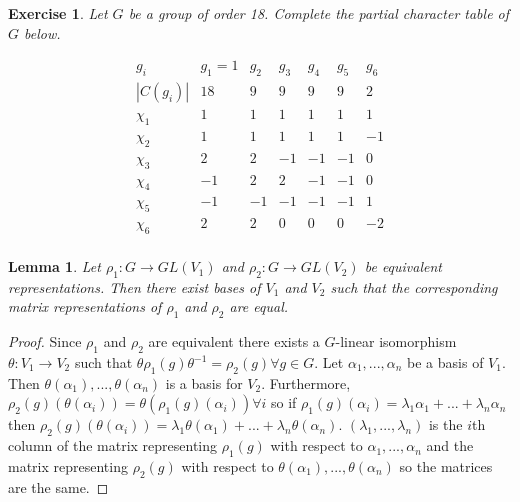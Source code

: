 \documentclass{article}
\newtheorem{lemma}[theorem]{Lemma}
\newtheorem{exercise}[theorem]{Exercise}
\begin{document}
\begin{exercise}
    Let \( G \) be a group of order 18. Complete the partial character table of \( G \) below.

    \[
    \begin{array}{c|cccccc}
    g_i & g_1 = 1 & g_2 & g_3 & g_4 & g_5 & g_6 \\
    |C(g_i)| & 18 & 9 & 9 & 9 & 9 & 2 \\
    \hline
    \chi_1 & 1 & 1 & 1 & 1 & 1 & 1 \\
    \chi_2 & 1 & 1 & 1 & 1 & 1 & -1 \\
    \chi_3 & 2 & 2 & -1 & -1 & -1 & 0 \\
    \chi_4 & -1 & 2 & 2 & -1 & -1 & 0 \\
    \chi_5 & -1 & -1 & -1 & -1 & -1 & 1 \\
    \chi_6 & 2 & 2 & 0 & 0 & 0 & -2 \\
    \end{array}
    \]
\end{exercise}


\begin{lemma}
Let $\rho_1:G\to GL(V_1)$ and $\rho_2:G\to GL(V_2)$ be equivalent representations. Then there exist bases of $V_1$ and $V_2$ such that the corresponding matrix representations of $\rho_1$ and $\rho_2$ are equal.
\end{lemma}
\begin{proof}
Since $\rho_1$ and $\rho_2$ are equivalent there exists a $G$-linear isomorphism $\theta:V_1\to V_2$ such that $\theta\rho_1(g)\theta^{-1}=\rho_2(g)\forall g\in G$. Let $\alpha_1,...,\alpha_n$ be a basis of $V_1$. Then $\theta(\alpha_1),...,\theta(\alpha_n)$ is a basis for $V_2$. Furthermore, $\rho_2(g)(\theta(\alpha_i))=\theta(\rho_1(g)(\alpha_i))\forall i$ so if $\rho_1(g)(\alpha_i)=\lambda_1\alpha_1+...+\lambda_n\alpha_n$ then $\rho_2(g)(\theta(\alpha_i))=\lambda_1\theta(\alpha_1)+...+\lambda_n\theta(\alpha_n)$. $(\lambda_1,...,\lambda_n)$ is the $i$th column of the matrix representing $\rho_1(g)$ with respect to $\alpha_1,...,\alpha_n$ and the matrix representing $\rho_2(g)$ with respect to $\theta(\alpha_1),...,\theta(\alpha_n)$ so the matrices are the same.
\end{proof}
\end{document}

